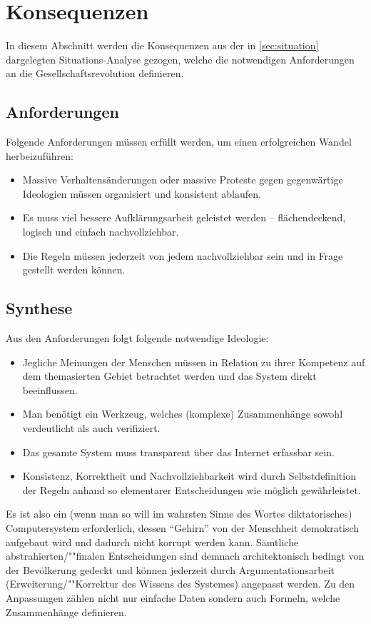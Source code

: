 \section{Konsequenzen}\label{sec:consequences}

In diesem Abschnitt werden die Konsequenzen aus der in \vref{sec:situation} dargelegten Situations-Analyse gezogen, welche die notwendigen Anforderungen an die Gesellschaftsrevolution definieren.

\subsection{Anforderungen}\label{sec:consequences/requirements}

Folgende Anforderungen müssen erfüllt werden, um einen erfolgreichen Wandel herbeizuführen:
\begin{itemize}
\item Massive Verhaltensänderungen oder massive Proteste gegen gegenwärtige Ideologien müssen organisiert und konsistent ablaufen.
\item Es muss viel bessere Aufklärungsarbeit geleistet werden -- flächendeckend, logisch und einfach nachvollziehbar.
\item Die Regeln müssen jederzeit von jedem nachvollziehbar sein und in Frage gestellt werden können.
\end{itemize}

\subsection{Synthese}\label{sec:consequences/synthesis}

Aus den Anforderungen folgt folgende notwendige Ideologie:
\begin{itemize}
\item Jegliche Meinungen der Menschen müssen in Relation zu ihrer Kompetenz auf dem themasierten Gebiet betrachtet werden und das System direkt beeinflussen.
\item Man benötigt ein Werkzeug, welches (komplexe) Zusammenhänge sowohl verdeutlicht als auch verifiziert.
\item Das gesamte System muss transparent über das Internet erfassbar sein.
\item Konsistenz, Korrektheit und Nachvollziehbarkeit wird durch Selbstdefinition der Regeln anhand so elementarer Entscheidungen wie möglich gewährleistet. 
\end{itemize}

Es ist also ein (wenn man so will im wahrsten Sinne des Wortes diktatorisches) Computersystem erforderlich, dessen "`Gehirn"' von der Menschheit demokratisch aufgebaut wird und dadurch nicht korrupt werden kann. Sämtliche abstrahierten/""finalen Entscheidungen sind demnach architektonisch bedingt von der Bevölkerung gedeckt und können jederzeit durch Argumentationsarbeit (Erweiterung/""Korrektur des Wissens des Systemes) angepasst werden. Zu den Anpassungen zählen nicht nur einfache Daten sondern auch Formeln, welche Zusammenhänge definieren.


